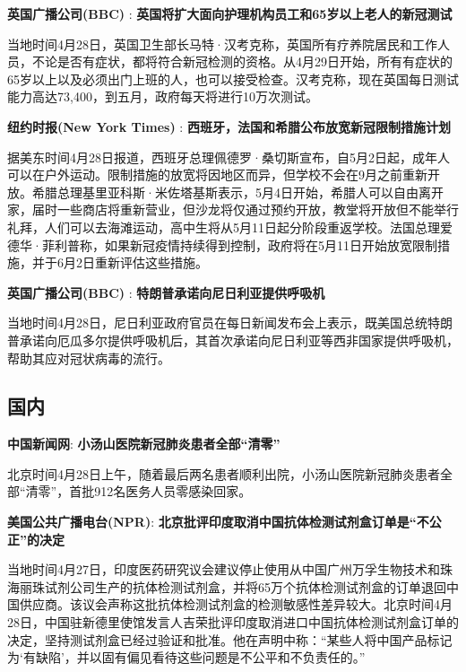 \documentclass[
]{article}
\begin{document}
\textbf{\textcolor{glaucous}{英国广播公司(BBC)}} :
\textbf{英国将扩大面向护理机构员工和65岁以上老人的新冠测试}

当地时间4月28日，英国卫生部长马特·汉考克称，英国所有疗养院居民和工作人员，不论是否有症状，都将符合新冠检测的资格。从4月29日开始，所有有症状的65岁以上以及必须出门上班的人，也可以接受检查。汉考克称，现在英国每日测试能力高达73,400，到五月，政府每天将进行10万次测试。

\textbf{\textcolor{glaucous}{纽约时报(New York Times)}} :
\textbf{西班牙，法国和希腊公布放宽新冠限制措施计划 }

据美东时间4月28日报道，西班牙总理佩德罗·桑切斯宣布，自5月2日起，成年人可以在户外运动。限制措施的放宽将因地区而异，但学校不会在9月之前重新开放。希腊总理基里亚科斯·米佐塔基斯表示，5月4日开始，希腊人可以自由离开家，届时一些商店将重新营业，但沙龙将仅通过预约开放，教堂将开放但不能举行礼拜，人们可以去海滩运动，高中生将从5月11日起分阶段重返学校。法国总理爱德华·菲利普称，如果新冠疫情持续得到控制，政府将在5月11日开始放宽限制措施，并于6月2日重新评估这些措施。

\textbf{\textcolor{glaucous}{英国广播公司(BBC)}} :
\textbf{特朗普承诺向尼日利亚提供呼吸机 }

当地时间4月28日，尼日利亚政府官员在每日新闻发布会上表示，既美国总统特朗普承诺向厄瓜多尔提供呼吸机后，其首次承诺向尼日利亚等西非国家提供呼吸机，帮助其应对冠状病毒的流行。

\vspace{-5mm}

\hypertarget{section-1}{%
\subsection{\texorpdfstring{\textcolor{glaucous}{\Huge 国内}}{}}\label{section-1}}

\vspace{-3mm}

\textbf{\textcolor{glaucous}{中国新闻网}}:
\textbf{小汤山医院新冠肺炎患者全部``清零'' }

北京时间4月28日上午，随着最后两名患者顺利出院，小汤山医院新冠肺炎患者全部``清零''，首批912名医务人员零感染回家。

\textbf{\textcolor{glaucous}{美国公共广播电台(NPR)}}:
\textbf{北京批评印度取消中国抗体检测试剂盒订单是``不公正''的决定}

当地时间4月27日，印度医药研究议会建议停止使用从中国广州万孚生物技术和珠海丽珠试剂公司生产的抗体检测试剂盒，并将65万个抗体检测试剂盒的订单退回中国供应商。该议会声称这批抗体检测试剂盒的检测敏感性差异较大。北京时间4月28日，中国驻新德里使馆发言人吉荣批评印度取消进口中国抗体检测试剂盒订单的决定，坚持测试剂盒已经过验证和批准。他在声明中称：``某些人将中国产品标记为`有缺陷'，并以固有偏见看待这些问题是不公平和不负责任的。''
\end{document}
